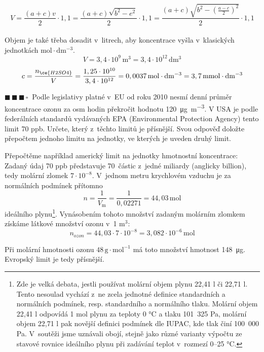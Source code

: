 \documentclass{book}
\newcommand{\tri}{$\blacksquare \, \blacksquare \, \blacksquare \, \square \; \; $}
\renewenvironment{quotation}{\par}{\par} %
\begin{document}
\[
V=\frac{(a+c)v}{2}\cdot1,1=\frac{(a+c)\sqrt{b^{2}-e^{2}}}{2}\cdot1,1=\frac{(a+c)\sqrt{b^{2}-\left(\frac{a-c}{2}\right)^{2}}}{2}\cdot1,1
\]
\\
Objem je také třeba dosadit v~litrech, aby koncentrace vyšla v~klasických jednotkách $\mathrm{mol\cdot dm^{-3}}$.
\[
V=3,4\cdot10^{9}\,\mathrm{m^{3}}=3,4\cdot10^{12}\,\mathrm{dm^{3}}
\]
\[
c=\frac{n_{\ce{H2SO4}}}{V}=\frac{1,25\cdot10^{10}}{3,4\cdot10^{12}}=0,0037\,\mathrm{mol\cdot dm^{-3}} =3,7\,\mathrm{mmol\cdot dm^{-3}}
\]


\hrulefill %
\begin{quotation}
\tri Podle legislativy platné v~EU od roku 2010 nesmí denní průměr koncentrace
ozonu za osm hodin překročit hodnotu \SI[inter-unit-product = \ensuremath{{}\cdot{}}]{120}{\micro\gram\per\cubic\metre}.
V USA je podle federálních standardů vydávaných EPA (Environmental
Protection Agency) tento limit 70 ppb. Určete, který z~těchto limitů
je přísnější. Svou odpověď doložte přepočtem jednoho limitu na jednotky,
ve kterých je uveden druhý limit.
\end{quotation} \dotfill \par 
Přepočtěme například americký limit na jednotky hmotnostní koncentrace:
Zadaný údaj 70 ppb představuje 70~částic z~jedné miliardy (anglicky
billion), tedy molární zlomek $7\cdot10^{-8}$. V~jednom metru krychlovém
vzduchu je za normálních podmínek přítomno 
\[
n=\frac{1}{V_{\mathrm{m}}}=\frac{1}{0,02271}=44,03\,\mathrm{mol}
\]
ideálního plynu\footnote{Zde je velká debata, jestli používat molární objem plynu 22,41 l či
22,71 l. Tento nesoulad vychází z~ne zcela jednotné definice standardních
a normálních podmínek, resp. standardního a normálního tlaku. Molární
objem 22,41 l odpovídá 1 mol plynu za teploty 0 °C a tlaku 101~325 Pa,
molární objem 22,71 l pak novější definici podmínek dle IUPAC, kde
tlak činí 100~000 Pa. V~soutěži jsme uznávali obojí, stejně jako různé
varianty výpočtu ze stavové rovnice ideálního plynu při zadávání
teplot v~rozmezí 0--25 °C.}. Vynásobením tohoto množství zadaným molárním zlomkem získáme látkové
množství ozonu v~1 m$^{3}$:
\[
n_{ozon} = 44,03 \cdot 7\cdot 10^{-8} =3,082\cdot10^{-6}\,\mathrm{mol}
\]

Při molární hmotnosti ozonu $48\,\mathrm{g\cdot mol^{-1}}$ má toto
množství hmotnost \SI{148}{\micro\gram}. Evropský limit je tedy přísnější. 
\end{document}
